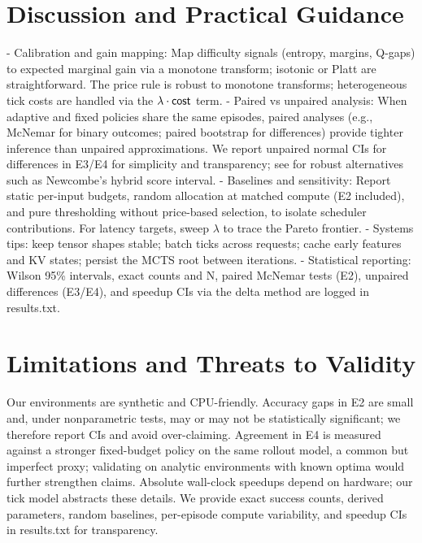 \section{Discussion and Practical Guidance}
\label{sec:guidance}
- Calibration and gain mapping: Map difficulty signals (entropy, margins, Q-gaps) to expected marginal gain via a monotone transform; isotonic or Platt \cite{Platt1999} are straightforward. The price rule is robust to monotone transforms; heterogeneous tick costs are handled via the $\lambda \cdot \mathsf{cost}$ term.
- Paired vs unpaired analysis: When adaptive and fixed policies share the same episodes, paired analyses (e.g., McNemar for binary outcomes; paired bootstrap for differences) provide tighter inference than unpaired approximations. We report unpaired normal CIs for differences in E3/E4 for simplicity and transparency; see \cite{Newcombe1998Diff,Agresti2002} for robust alternatives such as Newcombe’s hybrid score interval.
- Baselines and sensitivity: Report static per-input budgets, random allocation at matched compute (E2 included), and pure thresholding without price-based selection, to isolate scheduler contributions. For latency targets, sweep $\lambda$ to trace the Pareto frontier.
- Systems tips: keep tensor shapes stable; batch ticks across requests; cache early features and KV states; persist the MCTS root between iterations.
- Statistical reporting: Wilson 95\% intervals, exact counts and N, paired McNemar tests (E2), unpaired differences (E3/E4), and speedup CIs via the delta method \cite{CasellaBerger2002} are logged in results.txt.

\section{Limitations and Threats to Validity}
Our environments are synthetic and CPU-friendly. Accuracy gaps in E2 are small and, under nonparametric tests, may or may not be statistically significant; we therefore report CIs and avoid over-claiming. Agreement in E4 is measured against a stronger fixed-budget policy on the same rollout model, a common but imperfect proxy; validating on analytic environments with known optima would further strengthen claims. Absolute wall-clock speedups depend on hardware; our tick model abstracts these details. We provide exact success counts, derived parameters, random baselines, per-episode compute variability, and speedup CIs in results.txt for transparency.

